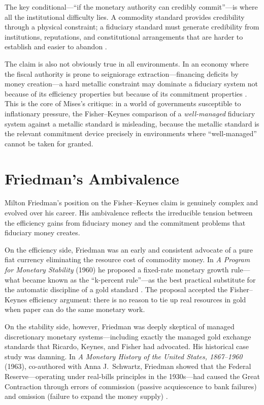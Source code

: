 \documentclass[12pt]{article}
\begin{document}
The key conditional---``if the monetary authority can credibly
commit''---is where all the institutional difficulty lies.  A
commodity standard provides credibility through a physical
constraint; a fiduciary standard must generate credibility
from institutions, reputations, and constitutional arrangements
that are harder to establish and easier to abandon
\citep{Bordo1990, BarroGordon1983}.

The claim is also not obviously true in all environments.  In an
economy where the fiscal authority is prone to seigniorage
extraction---financing deficits by money creation---a
hard metallic constraint may dominate a fiduciary system not
because of its efficiency properties but because of its
commitment properties \citep{Sargent1982unpleasant}.  This is
the core of Mises's critique: in a world of governments
susceptible to inflationary pressure, the Fisher--Keynes comparison
of a \emph{well-managed} fiduciary system against a metallic
standard is misleading, because the metallic standard is the
relevant commitment device precisely in environments where
``well-managed'' cannot be taken for granted.

\section{Friedman's Ambivalence}
\label{sec:friedman}

Milton Friedman's position on the Fisher--Keynes claim is genuinely
complex and evolved over his career.  His ambivalence reflects
the irreducible tension between the efficiency gains from fiduciary
money and the commitment problems that fiduciary money creates.

On the efficiency side, Friedman was an early and consistent
advocate of a pure fiat currency eliminating the resource cost
of commodity money.  In \textit{A Program for Monetary Stability}
(1960) he proposed a fixed-rate monetary growth rule---what
became known as the ``k-percent rule''---as the best practical
substitute for the automatic discipline of a gold standard
\citep{Friedman1960}.  The proposal accepted the Fisher--Keynes
efficiency argument: there is no reason to tie up real resources
in gold when paper can do the same monetary work.

On the stability side, however, Friedman was deeply skeptical
of managed discretionary monetary systems---including exactly
the managed gold exchange standards that Ricardo, Keynes, and
Fisher had advocated.  His historical case study was damning.
In \textit{A Monetary History of the United States, 1867--1960}
(1963), co-authored with Anna J.\ Schwartz, Friedman showed that
the Federal Reserve---operating under real-bills principles in
the 1930s---had caused the Great Contraction through errors of
commission (passive acquiescence to bank failures) and omission
(failure to expand the money supply) \citep{FriedmanSchwartz1963}.
\end{document}
